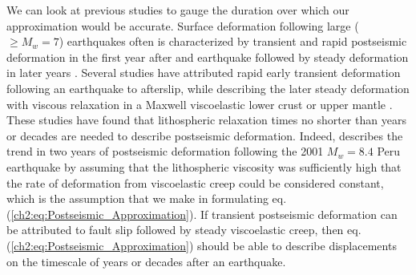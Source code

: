 We can look at previous studies to gauge the duration over which our
approximation would be accurate.  Surface deformation following large
($\geq M_w=7$) earthquakes often is characterized by transient and
rapid postseismic deformation in the first year after and earthquake
followed by steady deformation in later years
\citep[e.g.,][]{Savage1997, Savage2005, Ergintav2009}.  Several
studies have attributed rapid early transient deformation following an
earthquake to afterslip, while describing the later steady deformation
with viscous relaxation in a Maxwell viscoelastic lower crust or upper
mantle \citep[e.g.,][]{Perfettini2005, Johnson2009, Hearn2009,
Freed2006a, Rollins2015}. These studies have found that lithospheric
relaxation times no shorter than years or decades are needed to
describe postseismic deformation. Indeed, \citet{Perfettini2005}
describes the trend in two years of postseismic deformation following
the 2001 $M_w=8.4$ Peru earthquake by assuming that the lithospheric
viscosity was sufficiently high that the rate of deformation from
viscoelastic creep could be considered constant, which is the
assumption that we make in formulating eq.
(\ref{ch2:eq:Postseismic_Approximation}). If transient postseismic
deformation can be attributed to fault slip followed by steady
viscoelastic creep, then eq. (\ref{ch2:eq:Postseismic_Approximation})
should be able to describe displacements on the timescale of years or
decades after an earthquake.

